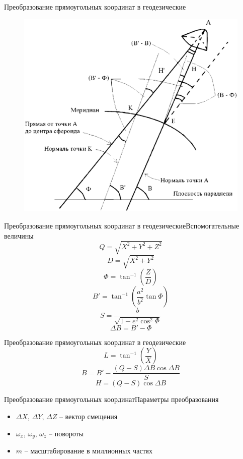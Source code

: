 \documentclass[aspectratio=43]{beamer}
\begin{document}
\begin{frame}{Преобразование прямоугольных координат в геодезические}
\begin{figure}
\includegraphics[scale=0.3]{ecef2geod}
\end{figure}
\end{frame}

\begin{frame}{Преобразование прямоугольных координат в геодезические}{Вспомогательные величины}
$$Q=\sqrt{X^2+Y^2+Z^2}$$
$$D=\sqrt{X^2+Y^2}$$
$$\Phi=\tan^{-1}\left(\frac{Z}{D}\right)$$
$$B'=\tan^{-1}\left(\frac{a^2}{b^2}\tan\Phi\right)$$
$$S=\frac{b}{\sqrt{1-e^2\cos^2\Phi}}$$
$$\Delta B=B'-\Phi$$

\end{frame}

\begin{frame}{Преобразование прямоугольных координат в геодезические}
$$L=\tan^{-1}\left(\frac{Y}{X}\right)$$
$$B=B'-\frac{(Q-S)\Delta B\cos\Delta B}{S}$$
$$H=(Q-S)\cos\Delta B$$

\end{frame}

\begin{frame}{Преобразование прямоугольных координат}{Параметры преобразования}
\begin{itemize}
\item $\Delta X$, $\Delta Y$, $\Delta Z$ -- вектор смещения
\item $\omega_x$, $\omega_y$, $\omega_z$ -- повороты
\item $m$ -- масштабирование в миллионных частях
\end{itemize}
\end{frame}
\end{document}
